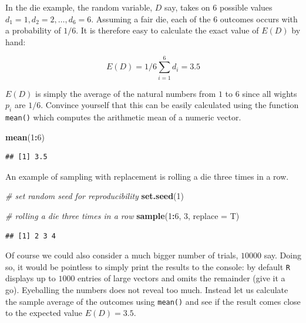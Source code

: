 \documentclass[]{book}
\newenvironment{Shaded}{\begin{snugshade}}{\end{snugshade}}
\newcommand{\KeywordTok}[1]{\textcolor[rgb]{0.13,0.29,0.53}{\textbf{#1}}}
\newcommand{\DataTypeTok}[1]{\textcolor[rgb]{0.13,0.29,0.53}{#1}}
\newcommand{\DecValTok}[1]{\textcolor[rgb]{0.00,0.00,0.81}{#1}}
\newcommand{\CommentTok}[1]{\textcolor[rgb]{0.56,0.35,0.01}{\textit{#1}}}
\newcommand{\OperatorTok}[1]{\textcolor[rgb]{0.81,0.36,0.00}{\textbf{#1}}}
\newcommand{\NormalTok}[1]{#1}
\theoremstyle{definition}
\theoremstyle{definition}
\theoremstyle{definition}
\theoremstyle{remark}
\begin{document}
In the die example, the random variable, \(D\) say, takes on \(6\)
possible values \(d_1 = 1, d_2 = 2, \dots, d_6 = 6\). Assuming a fair
die, each of the \(6\) outcomes occurs with a probability of \(1/6\). It
is therefore easy to calculate the exact value of \(E(D)\) by hand:

\[ E(D) = 1/6 \sum_{i=1}^6 d_i = 3.5 \]

\(E(D)\) is simply the average of the natural numbers from \(1\) to
\(6\) since all wights \(p_i\) are \(1/6\). Convince yourself that this
can be easily calculated using the function \texttt{mean()} which
computes the arithmetic mean of a numeric vector.

\begin{Shaded}
\begin{Highlighting}[]
\KeywordTok{mean}\NormalTok{(}\DecValTok{1}\OperatorTok{:}\DecValTok{6}\NormalTok{)}
\end{Highlighting}
\end{Shaded}

\begin{verbatim}
## [1] 3.5
\end{verbatim}

An example of sampling with replacement is rolling a die three times in
a row.

\begin{Shaded}
\begin{Highlighting}[]
\CommentTok{# set random seed for reproducibility}
\KeywordTok{set.seed}\NormalTok{(}\DecValTok{1}\NormalTok{)}

\CommentTok{# rolling a die three times in a row}
\KeywordTok{sample}\NormalTok{(}\DecValTok{1}\OperatorTok{:}\DecValTok{6}\NormalTok{, }\DecValTok{3}\NormalTok{, }\DataTypeTok{replace =}\NormalTok{ T)}
\end{Highlighting}
\end{Shaded}

\begin{verbatim}
## [1] 2 3 4
\end{verbatim}

Of course we could also consider a much bigger number of trials,
\(10000\) say. Doing so, it would be pointless to simply print the
results to the console: by default \texttt{R} displays up to \(1000\)
entries of large vectors and omits the remainder (give it a go).
Eyeballing the numbers does not reveal too much. Instead let us
calculate the sample average of the outcomes using \texttt{mean()} and
see if the result comes close to the expected value \(E(D)=3.5\).
\end{document}

